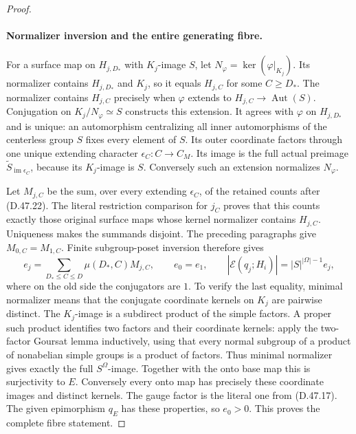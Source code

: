 \begin{proof}
\paragraph{Normalizer inversion and the entire generating fibre.}
For a surface map on \(H_{j,D_*}\) with \(K_j\)-image \(S\),
let \(N_\varphi=\ker(\varphi|_{K_j})\).
Its normalizer contains \(H_{j,D_*}\) and \(K_j\),
so it equals \(H_{j,C}\) for some \(C\geq D_*\).
The normalizer contains \(H_{j,C}\) precisely when
\(\varphi\) extends to \(H_{j,C}\to\operatorname{Aut}(S)\).
Conjugation on \(K_j/N_\varphi\simeq S\) constructs this
extension. It agrees with \(\varphi\) on \(H_{j,D_*}\)
and is unique: an automorphism centralizing all inner
automorphisms of the centerless group \(S\) fixes every
element of \(S\). Its outer coordinate factors through
one unique extending character \(\epsilon_C:C\to C_M\).
Its image is the full actual preimage
\(\widetilde S_{\operatorname{im}\epsilon_C}\), because
its \(K_j\)-image is \(S\). Conversely such an extension
normalizes \(N_\varphi\).

Let \(M_{j,C}\) be the sum, over every extending
\(\epsilon_C\), of the retained counts after
\textup{(D.47.22)}. The literal restriction comparison
for \(j_C\) proves that this counts exactly those
original surface maps whose kernel normalizer contains
\(H_{j,C}\). Uniqueness makes the summands disjoint.
The preceding paragraphs give \(M_{0,C}=M_{1,C}\).
Finite subgroup-poset inversion therefore gives
\[
 e_j=\sum_{D_*\leq C\leq D}\mu(D_*,C)M_{j,C},\qquad
 e_0=e_1,\qquad
 |\mathcal E(q_j;H_i)|=|S|^{|\Omega|-1}e_j,
 \tag{D.47.24}
\]
where on the old side the conjugators are \(1\).
To verify the last equality, minimal normalizer means
that the conjugate coordinate kernels on \(K_j\) are
pairwise distinct. The \(K_j\)-image is a subdirect
product of the simple factors. A proper such product
identifies two factors and their coordinate kernels:
apply the two-factor Goursat lemma inductively, using
that every normal subgroup of a product of nonabelian
simple groups is a product of factors. Thus minimal
normalizer gives exactly the full \(S^\Omega\)-image.
Together with the onto base map this is surjectivity
to \(E\). Conversely every onto map has precisely
these coordinate images and distinct kernels.
The gauge factor is the literal one from
\textup{(D.47.17)}. The given epimorphism \(q_E\)
has these properties, so \(e_0>0\). This proves the
complete fibre statement.


\end{proof}
